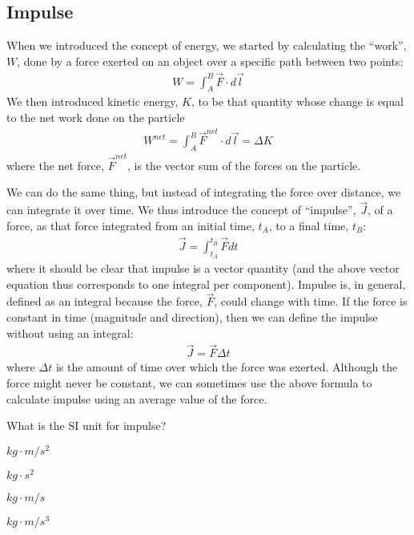 \subsection{Impulse}
When we introduced the concept of energy, we started by calculating the ``work'', $W$, done by a force exerted on an object over a specific path between two points:
\begin{align*}
W = \int_A^B \vec F \cdot d\vec l
\end{align*}
We then introduced kinetic energy, $K$, to be that quantity whose change is equal to the net work done on the particle
\begin{align*}
W^{net} = \int_A^B \vec F^{net}\cdot d\vec l = \Delta K
\end{align*}
where the net force, $\vec F^{net}$, is the vector sum of the forces on the particle.

We can do the same thing, but instead of integrating the force over distance, we can integrate it over time. We thus introduce the concept of ``impulse'', $\vec J$, of a force, as that force integrated from an initial time, $t_A$, to a final time, $t_B$:
\begin{align}
\vec J = \int_{t_A}^{t_B}\vec F dt
\end{align}
where it should be clear that impulse is a vector quantity (and the above vector equation thus corresponds to one integral per component). Impulse is, in general, defined as an integral because the force, $\vec F$, could change with time. If the force is constant in time (magnitude and direction), then we can define the impulse without using an integral:
\begin{align*}
\vec J = \vec F \Delta t
\end{align*}
where $\Delta t$ is the amount of time over which the force was exerted. Although the force might never be constant, we can sometimes use the above formula to calculate impulse using an average value of the force.

\begin{checkpoint}
\begin{MCquestion}{What is the SI unit for impulse?}
\item $\si{kg\cdot m/s^2}$
\item $\si{kg \cdot s^2}$
\item $\si{kg \cdot m/s}$\correct
\item $\si{kg \cdot m/s^3}$
\end{MCquestion}
\end{checkpoint}

